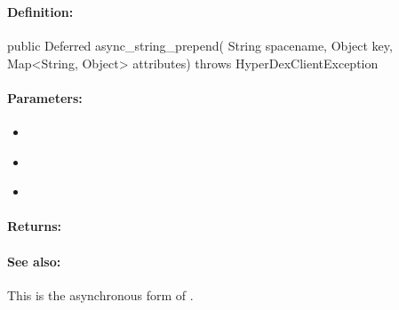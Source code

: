 \pagebreak
\subsubsection{}
\label{api:java:async_string_prepend}


\paragraph{Definition:}
\begin{javacode}
public Deferred async_string_prepend(
        String spacename,
        Object key,
        Map<String, Object> attributes) throws HyperDexClientException
\end{javacode}

\paragraph{Parameters:}
\begin{itemize}[noitemsep]
\item {}\\

\item {}\\

\item {}\\

\end{itemize}

\paragraph{Returns:}


\paragraph{See also:}  This is the asynchronous form of .

\pagebreak
\subsubsection{}
\label{api:java:cond_string_prepend}


